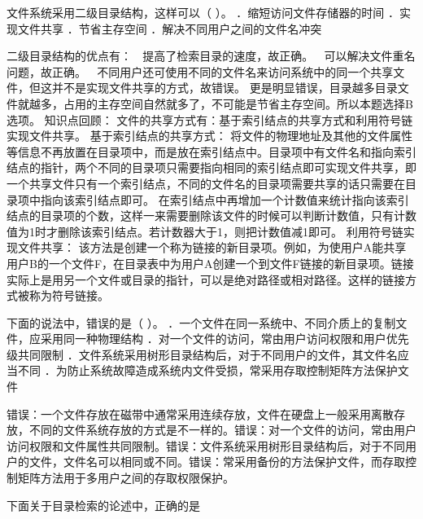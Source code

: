 \question 文件系统采用二级目录结构，这样可以（ ）。 ．缩短访问文件存储器的时间
．实现文件共享 ．节省主存空间 ．解决不同用户之间的文件名冲突
\par{}
\begin{solution}二级目录结构的优点有：  提高了检索目录的速度，故正确。 
可以解决文件重名问题，故正确。 
不同用户还可使用不同的文件名来访问系统中的同一个共享文件，但这并不是实现文件共享的方式，故错误。
更是明显错误，目录越多目录文件就越多，占用的主存空间自然就多了，不可能是节省主存空间。所以本题选择B选项。
知识点回顾：
文件的共享方式有：基于索引结点的共享方式和利用符号链实现文件共享。
基于索引结点的共享方式：
将文件的物理地址及其他的文件属性等信息不再放置在目录项中，而是放在索引结点中。目录项中有文件名和指向索引结点的指针，两个不同的目录项只需要指向相同的索引结点即可实现文件共享，即一个共享文件只有一个索引结点，不同的文件名的目录项需要共享的话只需要在目录项中指向该索引结点即可。
在索引结点中再增加一个计数值来统计指向该索引结点的目录项的个数，这样一来需要删除该文件的时候可以判断计数值，只有计数值为1时才删除该索引结点。若计数器大于1，则把计数值减1即可。
利用符号链实现文件共享：
该方法是创建一个称为链接的新目录项。例如，为使用户A能共享用户B的一个文件F，在目录表中为用户A创建一个到文件F链接的新目录项。链接实际上是用另一个文件或目录的指针，可以是绝对路径或相对路径。这样的链接方式被称为符号链接。
\end{solution}
\question 下面的说法中，错误的是（ ）。
．一个文件在同一系统中、不同介质上的复制文件，应采用同一种物理结构
．对一个文件的访问，常由用户访问权限和用户优先级共同限制
．文件系统采用树形目录结构后，对于不同用户的文件，其文件名应当不同
．为防止系统故障造成系统内文件受损，常采用存取控制矩阵方法保护文件
\par{}
\begin{solution}错误：一个文件存放在磁带中通常采用连续存放，文件在硬盘上一般采用离散存放，不同的文件系统存放的方式是不一样的。错误：对一个文件的访问，常由用户访问权限和文件属性共同限制。错误：文件系统采用树形目录结构后，对于不同用户的文件，文件名可以相同或不同。错误：常采用备份的方法保护文件，而存取控制矩阵方法用于多用户之间的存取权限保护。
\end{solution}
\question 下面关于目录检索的论述中，正确的是
\par{}
